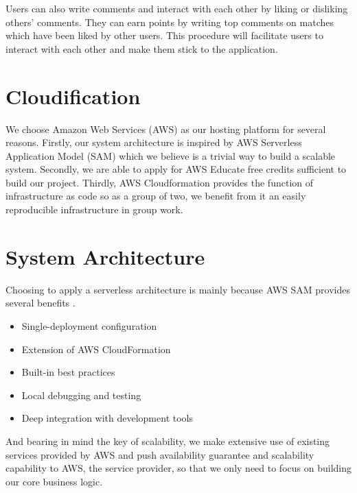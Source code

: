 \documentclass[conference]{IEEEtran}
\begin{document}
Users can also write comments and interact with each other
by liking or disliking others’ comments. They can earn points
by writing top comments on matches which have been liked
by other users. This procedure will facilitate users to interact
with each other and make them stick to the application.

\section{Cloudification}
We choose Amazon Web Services (AWS) \cite{b1} as our hosting platform for several reasons. Firstly, our system architecture is inspired by AWS Serverless Application Model (SAM) \cite{b2} which we believe is a trivial way to build a scalable system. Secondly, we are able to apply for AWS Educate free credits sufficient to build our project. Thirdly, AWS Cloudformation \cite{b3} provides the function of infrastructure as code so as a group of two, we benefit from it an easily reproducible infrastructure in group work.

\section{System Architecture}
Choosing to apply a serverless architecture is mainly because AWS SAM provides several benefits \cite{b2}. 
\begin{itemize}
\item Single-deployment configuration
\item Extension of AWS CloudFormation
\item Built-in best practices
\item Local debugging and testing
\item Deep integration with development tools
\end{itemize}

And bearing in mind the key of scalability, we make extensive use of existing services provided by AWS and push availability guarantee and scalability capability to AWS, the service provider, so that we only need to focus on building our core business logic.
\end{document}
